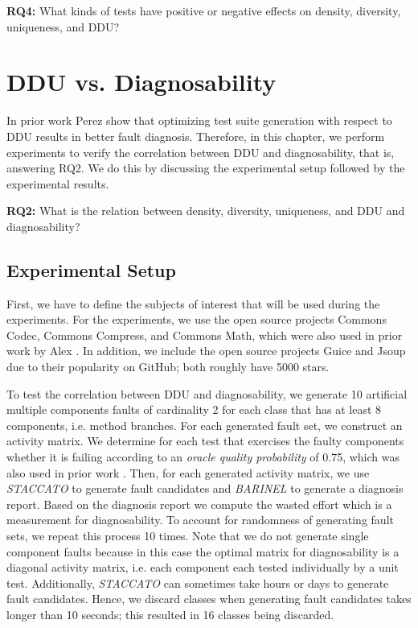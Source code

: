 \documentclass[twoside,a4paper,11pt]{memoir}
\begin{document}
\begin{framed}
\noindent
\textbf{RQ4:} What kinds of tests have positive or negative effects on density, diversity, uniqueness, and DDU?
\end{framed}
\chapter{DDU vs. Diagnosability}
\label{ch:rq2}
In prior work Perez \etal \cite{DBLP:conf/icse/PerezAD17} show that optimizing test suite generation with respect to DDU results in better fault diagnosis.
Therefore, in this chapter, we perform experiments to verify the correlation between DDU and diagnosability, that is, answering RQ2.
We do this by discussing the experimental setup followed by the experimental results.

\begin{framed}
\noindent
\textbf{RQ2:} What is the relation between density, diversity, uniqueness, and DDU and diagnosability?
\end{framed}


\section{Experimental Setup}
\label{sec:rq2_experimental_setup}
First, we have to define the subjects of interest that will be used during the experiments.
For the experiments, we use the open source projects Commons Codec, Commons Compress, and Commons Math, which were also used in prior work by Alex \etal \cite{DBLP:conf/icse/PerezAD17}.
In addition, we include the open source projects Guice and Jsoup due to their popularity on GitHub; both roughly have 5000 stars.

To test the correlation between DDU and diagnosability, we generate 10 artificial multiple components faults of cardinality 2 for each class that has at least 8 components, i.e. method branches.
For each generated fault set, we construct an activity matrix.
We determine for each test that exercises the faulty components whether it is failing according to an \emph{oracle quality probability} of 0.75, which was also used in prior work \cite{DBLP:conf/icse/PerezAD17}.
Then, for each generated activity matrix, we use \emph{STACCATO} to generate fault candidates and \emph{BARINEL} to generate a diagnosis report.
Based on the diagnosis report we compute the wasted effort which is a measurement for diagnosability.
To account for randomness of generating fault sets, we repeat this process 10 times.
Note that we do not generate single component faults because in this case the optimal matrix for diagnosability is a diagonal activity matrix, i.e. each component each tested individually by a unit test.
Additionally, \emph{STACCATO} can sometimes take hours or days to generate fault candidates.
Hence, we discard classes when generating fault candidates takes longer than 10 seconds; this resulted in 16 classes being discarded.
\end{document}
